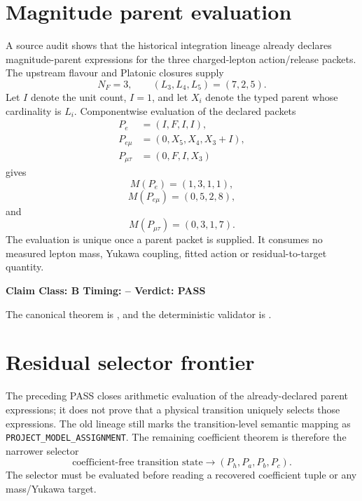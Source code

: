 \documentclass[11pt,a4paper,twoside]{book}
\theoremstyle{definition}
\newcommand{\vTwelveStatus}[3]{\par\noindent\textbf{Claim Class: #1 \quad Timing: #2 \quad Verdict: #3}\par}
\begin{document}
\section{Magnitude parent evaluation}
A source audit shows that the historical integration lineage already declares
magnitude-parent expressions for the three charged-lepton action/release
packets. The upstream flavour and Platonic closures supply
\begin{equation}
\boxed{N_F=3,\qquad (L_3,L_4,L_5)=(7,2,5).}
\label{eq:v12-magnitude-upstream-integers}
\end{equation}
Let $I$ denote the unit count, $I=1$, and let $X_i$ denote the typed parent
whose cardinality is $L_i$. Componentwise evaluation of the declared packets
\begin{align}
P_e&=(I,F,I,I),\\
P_{e\mu}&=(0,X_5,X_4,X_3+I),\\
P_{\mu\tau}&=(0,F,I,X_3)
\end{align}
gives
\begin{equation}
\boxed{M(P_e)=(1,3,1,1),}
\label{eq:v12-magnitude-electron}
\end{equation}
\begin{equation}
\boxed{M(P_{e\mu})=(0,5,2,8),}
\label{eq:v12-magnitude-emu}
\end{equation}
and
\begin{equation}
\boxed{M(P_{\mu\tau})=(0,3,1,7).}
\label{eq:v12-magnitude-mutau}
\end{equation}
The evaluation is unique once a parent packet is supplied. It consumes no
measured lepton mass, Yukawa coupling, fitted action or residual-to-target
quantity.

\vTwelveStatus{B}{--}{PASS}
The canonical theorem is
,
and the deterministic validator is
.

\section{Residual selector frontier}
The preceding PASS closes arithmetic evaluation of the already-declared parent
expressions; it does not prove that a physical transition uniquely selects those
expressions. The old lineage still marks the transition-level semantic mapping
as \texttt{PROJECT\_MODEL\_ASSIGNMENT}. The remaining coefficient theorem is
therefore the narrower selector
\begin{equation}
\boxed{
\text{coefficient-free transition state}
\longrightarrow
(P_h,P_a,P_b,P_c).
}
\label{eq:v12-coefficient-parent-selector}
\end{equation}
The selector must be evaluated before reading a recovered coefficient tuple or
any mass/Yukawa target.
\end{document}
